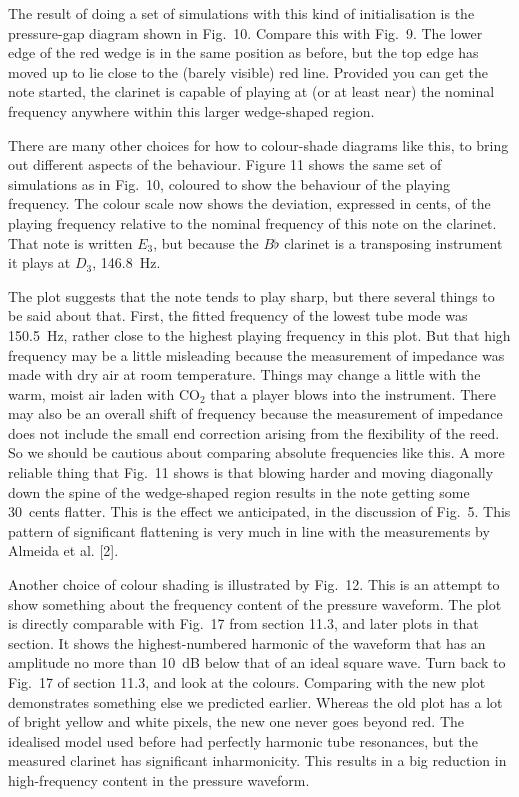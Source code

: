   The result of doing a set of simulations with this kind of initialisation is 
  the pressure-gap diagram shown in Fig.\ 10. Compare this with Fig.\ 9. The 
  lower edge of the red wedge is in the same position as before, but the top 
  edge has moved up to lie close to the (barely visible) red line. Provided you 
  can get the note started, the clarinet is capable of playing at (or at least 
  near) the nominal frequency anywhere within this larger wedge-shaped region. 

  There are many other choices for how to colour-shade diagrams like this, to 
  bring out different aspects of the behaviour. Figure 11 shows the same set of 
  simulations as in Fig.\ 10, coloured to show the behaviour of the playing 
  frequency. The colour scale now shows the deviation, expressed in cents, of 
  the playing frequency relative to the nominal frequency of this note on the 
  clarinet. That note is written $E_3$, but because the $B\flat$ clarinet is a 
  transposing instrument it plays at $D_3$, 146.8~Hz. 

  The plot suggests that the note tends to play sharp, but there several things 
  to be said about that. First, the fitted frequency of the lowest tube mode 
  was 150.5~Hz, rather close to the highest playing frequency in this plot. But 
  that high frequency may be a little misleading because the measurement of 
  impedance was made with dry air at room temperature. Things may change a 
  little with the warm, moist air laden with $\mathrm{CO}_2$ that a player 
  blows into the instrument. There may also be an overall shift of frequency 
  because the measurement of impedance does not include the small end 
  correction arising from the flexibility of the reed. So we should be cautious 
  about comparing absolute frequencies like this. A more reliable thing that 
  Fig.\ 11 shows is that blowing harder and moving diagonally down the spine of 
  the wedge-shaped region results in the note getting some 30~cents flatter. 
  This is the effect we anticipated, in the discussion of Fig.\ 5. This pattern 
  of significant flattening is very much in line with the measurements by 
  Almeida et al. [2]. 

  Another choice of colour shading is illustrated by Fig.\ 12. This is an 
  attempt to show something about the frequency content of the pressure 
  waveform. The plot is directly comparable with Fig.\ 17 from section 11.3, 
  and later plots in that section. It shows the highest-numbered harmonic of 
  the waveform that has an amplitude no more than 10~dB below that of an ideal 
  square wave. Turn back to Fig.\ 17 of section 11.3, and look at the colours. 
  Comparing with the new plot demonstrates something else we predicted earlier. 
  Whereas the old plot has a lot of bright yellow and white pixels, the new one 
  never goes beyond red. The idealised model used before had perfectly harmonic 
  tube resonances, but the measured clarinet has significant inharmonicity. 
  This results in a big reduction in high-frequency content in the pressure 
  waveform. 

